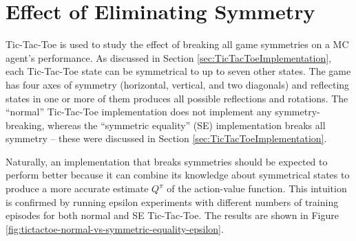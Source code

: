 \documentclass[11pt,a4paper]{report}
\begin{document}
\newpage


\section{Effect of Eliminating Symmetry}
\label{sec:eliminate-symmetry}

Tic-Tac-Toe is used to study the effect of breaking all game symmetries on a MC agent's performance. As discussed in Section \ref{sec:TicTacToeImplementation}, each Tic-Tac-Toe state can be symmetrical to up to seven other states. The game has four axes of symmetry (horizontal, vertical, and two diagonals) and reflecting states in one or more of them produces all possible reflections and rotations. The ``normal'' Tic-Tac-Toe implementation does not implement any symmetry-breaking, whereas the ``symmetric equality'' (SE) implementation breaks all symmetry -- these were discussed in Section \ref{sec:TicTacToeImplementation}.

Naturally, an implementation that breaks symmetries should be expected to perform better because it can combine its knowledge about symmetrical states to produce a more accurate estimate $Q^{\pi}$ of the action-value function. This intuition is confirmed by running epsilon experiments with different numbers of training episodes for both normal and SE Tic-Tac-Toe. The results are shown in Figure \ref{fig:tictactoe-normal-vs-symmetric-equality-epsilon}.
\end{document}
